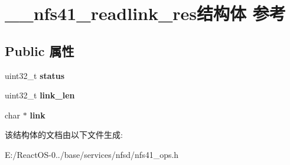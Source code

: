 \hypertarget{struct____nfs41__readlink__res}{}\section{\+\_\+\+\_\+nfs41\+\_\+readlink\+\_\+res结构体 参考}
\label{struct____nfs41__readlink__res}
\subsection*{Public 属性}
\begin{DoxyCompactItemize}
\item 
\mbox{\label{struct____nfs41__readlink__res_afa2beaf62f229c84069446e7107cffd0}} 
uint32\+\_\+t {\bfseries status}
\item 
\mbox{\label{struct____nfs41__readlink__res_ae9f76142a5e4e1e924dea688d216a66e}} 
uint32\+\_\+t {\bfseries link\+\_\+len}
\item 
\mbox{\label{struct____nfs41__readlink__res_a5b4a2e310683d81789558c546968d876}} 
char $\ast$ {\bfseries link}
\end{DoxyCompactItemize}


该结构体的文档由以下文件生成\+:\begin{DoxyCompactItemize}
\item 
E\+:/\+React\+O\+S-\/0../base/services/nfsd/nfs41\+\_\+ops.\+h\end{DoxyCompactItemize}
